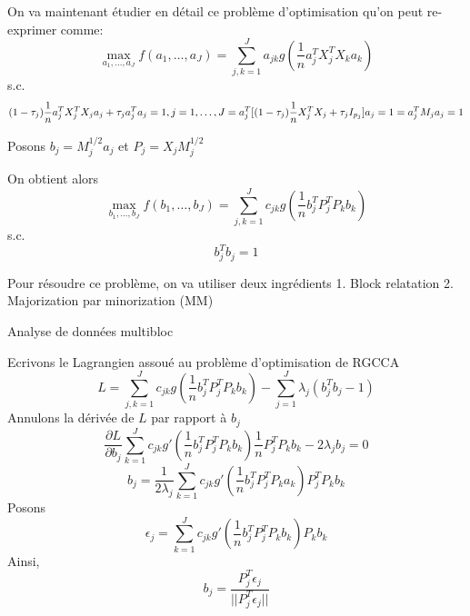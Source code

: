 \documentclass{article}
\begin{document}
On va maintenant \'etudier en d\'etail ce probl\`eme d'optimisation qu'on peut re-exprimer comme:
\begin{equation}
\max_{a_1,\ldots,a_J} f(a_1,\ldots,a_J) = \sum_{j,k=1}^Ja_{jk}g(\frac{1}{n}a^T_jX^T_jX_ka_k)
\end{equation}
s.c.
\begin{equation}
(1-\tau_j)\frac{1}{n}a_j^TX_j^TX_ja_j+\tau_ja^T_ja_j=1,j=1,\ldots,J\\
=a_j^T[(1-\tau_j)\frac{1}{n}X^T_jX_j+\tau_jI_{p_j}]a_j=1\\
=a^T_jM_ja_j=1
\end{equation}

Posons $b_j=M^{1/2}_ja_j$ et $P_j=X_jM_j^{1/2}$

On obtient alors
\begin{equation}
\max_{b_1,\ldots,b_J}f(b_1,\ldots,b_J)=\sum_{j,k=1}^Jc_{jk}g(\frac{1}{n}b_j^TP_j^TP_kb_k)
\end{equation}
s.c.
\begin{equation}
b_j^Tb_j=1
\end{equation}

Pour r\'esoudre ce probl\`eme, on va utiliser deux ingr\'edients
1. Block relatation
2. Majorization par minorization (MM)

Analyse de donn\'ees multibloc

Ecrivons le Lagrangien assou\'e au probl\`eme d'optimisation de RGCCA
\begin{equation}
L=\sum_{j,k=1}^J c_{jk}g(\frac{1}{n}b_j^TP_j^TP_kb_k)-\sum_{j=1}^J\lambda_j(b^T_jb_j-1)
\end{equation}
Annulons la d\'eriv\'ee de $L$ par rapport \`a $b_j$
\begin{equation}
\frac{\partial L}{\partial b_j}\sum_{k=1}^J c_{jk} g'(\frac{1}{n}b_j^TP_j^TP_kb_k)\frac{1}{n}P_j^TP_kb_k-2\lambda_jb_j=0
\end{equation}
\begin{equation}
b_j=\frac{1}{2\lambda_j}\sum_{k=1}^Jc_{jk}g'(\frac{1}{n}b_j^TP_j^TP_ka_k)P^T_jP_kb_k
\end{equation}
Posons
\begin{equation}
\epsilon_j=\sum_{k=1}^Jc_{jk}g'(\frac{1}{n}b_j^TP_j^TP_kb_k)P_kb_k
\end{equation}
Ainsi,
\begin{equation}
b_j=\frac{P_j^T\epsilon_j}{||P_j^T\epsilon_j||}
\end{equation}
\end{document}
